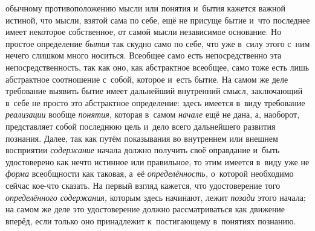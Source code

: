 обычному противоположению мысли или понятия и~бытия кажется важной истиной,
что мысли, взятой сама по себе, ещё не присуще бытие и~что последнее имеет
некоторое собственное, от самой мысли независимое основание. Но простое
определение {\em бытия}
так скудно само по себе, что уже в~силу этого с~ним нечего
слишком много носиться. Всеобщее само есть непосредственно эта
непосредственность, так как оно, как абстрактное всеобщее, само тоже есть
лишь абстрактное соотношение с~собой, которое и~есть бытие. На самом же
деле требование выявить бытие имеет дальнейший внутренний
смысл, заключающий в~себе не просто это абстрактное определение: здесь
имеется в~виду требование {\em реализации} вообще
{\em понятия,} которая в~самом {\em начале} ещё не
дана, а, наоборот, представляет собой последнюю цель и~дело всего
дальнейшего развития познания. Далее, так как путём показывания во
внутреннем или внешнем восприятии {\em содержание} начала
должно получить своё оправдание и~быть удостоверено как нечто истинное или
правильное, то этим имеется в~виду уже не
{\em форма} всеобщности
как таковая, а~её {\em определённость,}
о~которой необходимо сейчас кое-что сказать. На первый взгляд
кажется, что удостоверение того {\em определённого содержания,}
которым здесь начинают, лежит {\em позади} этого начала;
на самом же деле это удостоверение должно рассматриваться как движение
вперёд, если только оно принадлежит к~постигающему в~понятиях познанию.

